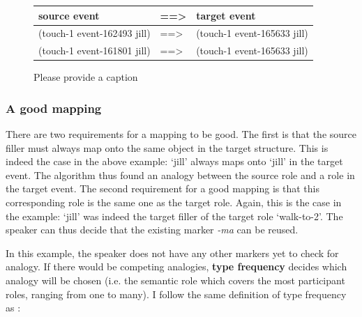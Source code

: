 \begin{figure}[h]
\footnotesize
 \begin{tabular}{lll} 
{\bfseries source event} & {\bfseries ==>} & {\bfseries target event} \\
\midrule
(touch-1 event-162493 jill) &  ==> & (touch-1 event-165633 jill)\\
(touch-1 event-161801 jill) & ==> &  (touch-1 event-165633 jill)\\
\end{tabular} 
\caption{Please provide a caption}
\label{fig:3:mapping}
\end{figure}

\subsubsection{A good mapping}
 There are two requirements for a mapping to be good. The first is that the source filler must always map onto the same object in the target structure. This is indeed the case in the above example: `jill' always maps onto `jill' in the target event. The algorithm thus found an analogy between the source role and a role in the target event. The second requirement for a good mapping is that this corresponding role is the same one as the target role. Again, this is the case in the example: `jill' was indeed the target filler of the target role `walk-to-2'. The speaker can thus decide that the existing marker {\em -ma} can be reused.

In this example, the speaker does not have any other markers yet to check for analogy. If there would be competing analogies, {\bfseries type frequency} decides which analogy will be chosen (i.e. the semantic role which covers the most participant roles, ranging from one to many). I follow the same definition of type frequency as \citet[77]{bybee00three}:

